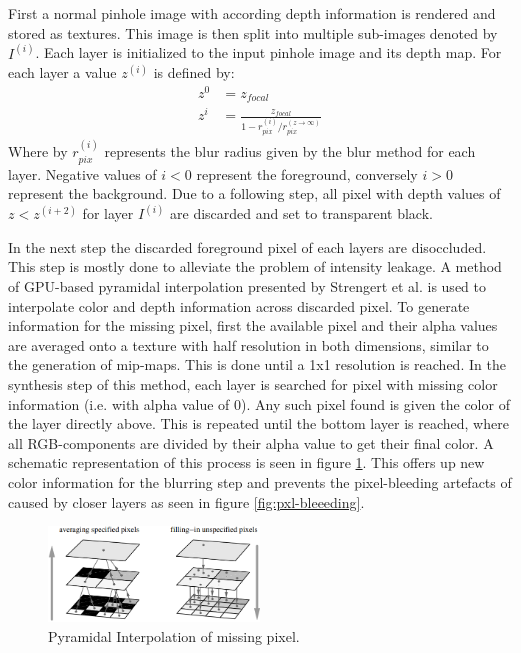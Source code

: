 First a normal pinhole image with according depth information is rendered and stored as textures.
This image is then split into multiple sub-images denoted by $I^{(i)}$.
Each layer is initialized to the input pinhole image and its depth map.
For each layer a value $z^{(i)}$ is defined by:
\begin{align}
    z^0 &= z_{focal} \\
    z^i &= \frac{z_{focal}}{1 - r^{(i)}_{pix} / r^{(z \rightarrow \infty)}_{pix}}
\end{align}
Where by $r^{(i)}_{pix}$ represents the blur radius given by the blur method for each layer.
Negative values of $i < 0$ represent the foreground, conversely $i > 0$ represent the background.
Due to a following step, all pixel with depth values of $z < z^{(i+2)}$ for layer $I^{(i)}$ are discarded and set to transparent black.\cite{Kraus.2007}

In the next step the discarded foreground pixel of each layers are disoccluded.
This step is mostly done to alleviate the problem of intensity leakage.
A method of GPU-based pyramidal interpolation presented by Strengert et al. \cite{Strengert.2006} is used to interpolate color and depth information across discarded pixel.
To generate information for the missing pixel, first the available pixel and their alpha values are averaged onto a texture with half resolution in both dimensions, similar to the generation of mip-maps.
This is done until a 1x1 resolution is reached.
In the synthesis step of this method, each layer is searched for pixel with missing color information (i.e. with alpha value of 0).
Any such pixel found is given the color of the layer directly above.
This is repeated until the bottom layer is reached, where all RGB-components are divided by their alpha value to get their final color.
A schematic representation of this process is seen in figure \ref{fig:pyramidal-interpolation}.
This offers up new color information for the blurring step and prevents the pixel-bleeding artefacts of caused by closer layers as seen in figure \ref{fig:pxl-bleeeding}.

\begin{figure}[h]
    \centering
    \includegraphics[width=0.5\textwidth]{images/pyramidal-interpolation.png}
    \caption{Pyramidal Interpolation of missing pixel.\cite{Kraus.2007}}
    \label{fig:pyramidal-interpolation}
\end{figure}

